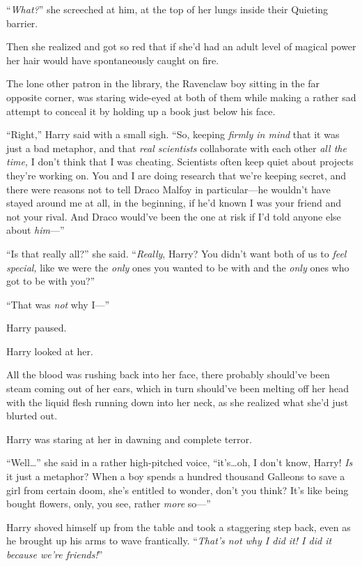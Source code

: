 “\emph{What?}” she screeched at him, at the top of her lungs inside their Quieting barrier.

Then she realized and got so red that if she’d had an adult level of magical power her hair would have spontaneously caught on fire.

The lone other patron in the library, the Ravenclaw boy sitting in the far opposite corner, was staring wide-eyed at both of them while making a rather sad attempt to conceal it by holding up a book just below his face.

“Right,” Harry said with a small sigh. “So, keeping \emph{firmly in mind} that it was just a bad metaphor, and that \emph{real scientists} collaborate with each other \emph{all the time,} I don’t think that I was cheating. Scientists often keep quiet about projects they’re working on. You and I are doing research that we’re keeping secret, and there were reasons not to tell Draco Malfoy in particular—he wouldn’t have stayed around me at all, in the beginning, if he’d known I was your friend and not your rival. And Draco would’ve been the one at risk if I’d told anyone else about \emph{him}—”

“Is that really all?” she said. “\emph{Really}, Harry? You didn’t want both of us to \emph{feel special,} like we were the \emph{only} ones you wanted to be with and the \emph{only} ones who got to be with you?”

“That was \emph{not} why I—”

Harry paused.

Harry looked at her.

All the blood was rushing back into her face, there probably should’ve been steam coming out of her ears, which in turn should’ve been melting off her head with the liquid flesh running down into her neck, as she realized what she’d just blurted out.

Harry was staring at her in dawning and complete terror.

“Well…” she said in a rather high-pitched voice, “it’s…oh, I don’t know, Harry! \emph{Is} it just a metaphor? When a boy spends a hundred thousand Galleons to save a girl from certain doom, she’s entitled to wonder, don’t you think? It’s like being bought flowers, only, you see, rather \emph{more} so—”

Harry shoved himself up from the table and took a staggering step back, even as he brought up his arms to wave frantically. “\emph{That’s not why I did it! I did it because we’re friends!}”

